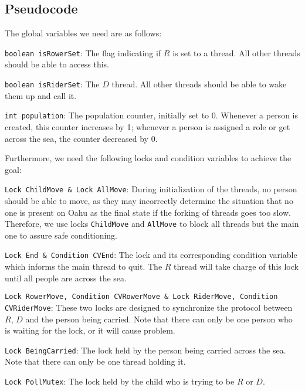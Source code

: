 \documentclass{article}
\begin{document}
\begin{spacing}{1.1}
\subsection{Pseudocode}
The global variables we need are as follows:
\begin{asparaitem}
  \item \texttt{boolean isRowerSet}: The flag indicating if $R$ is set to a thread. All other threads should be able to access this.\\
  \item \texttt{boolean isRiderSet}: The $D$ thread. All other threads should be able to wake them up and call it.\\
  \item \texttt{int population}: The population counter, initially set to 0. Whenever a person is created, this counter increases by 1; whenever a person is assigned a role or get across the sea, the counter decreased by 0.\\
\end{asparaitem}

Furthermore, we need the following locks and condition variables to achieve the goal:\\
\begin{asparaitem}
  \item \texttt{Lock ChildMove \& Lock AllMove}: During initialization of the threads, no person should be able to move, as they may incorrectly determine the situation that no one is present on Oahu as the final state if the forking of threads goes too slow. Therefore, we use locks \texttt{ChildMove} and \texttt{AllMove} to block all threads but the main one to assure safe conditioning.\\
  \item \texttt{Lock End \& Condition CVEnd}: The lock and its corresponding condition variable which informs the main thread to quit. The $R$ thread will take charge of this lock until all people are across the sea.\\
  \item \texttt{Lock RowerMove, Condition CVRowerMove \& Lock RiderMove, Condition CVRiderMove}: These two locks are designed to synchronize the protocol between $R$, $D$ and the person being carried. Note that there can only be one person who is waiting for the lock, or it will cause problem.\\
  \item \texttt{Lock BeingCarried}: The lock held by the person being carried across the sea. Note that there can only be one thread holding it.\\
  \item \texttt{Lock PollMutex}: The lock held by the child who is trying to be $R$ or $D$.\\
\end{asparaitem}


\end{spacing}
\end{document}
